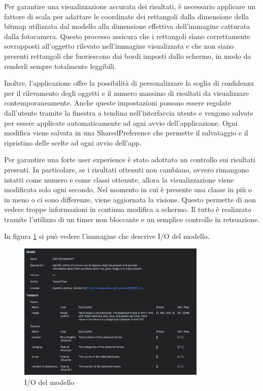 Per garantire una visualizzazione accurata dei risultati, è necessario applicare un fattore di scala per adattare le coordinate dei rettangoli dalla
dimensione della bitmap utilizzata dal modello alla dimensione effettiva dell'immagine catturata dalla fotocamera. Questo processo assicura che i rettangoli
siano correttamente sovrapposti all'oggetto rilevato nell'immagine visualizzata e che non siano presenti rettangoli che fuoriescono dai bordi imposti dallo
schermo, in modo da renderli sempre totalmente leggibili.

Inoltre, l'applicazione offre la possibilità di personalizzare la soglia di confidenza per il rilevamento degli oggetti e il numero massimo di risultati da
visualizzare contemporaneamente. Anche queste impostazioni possono essere regolate dall'utente tramite la finestra a tendina nell'interfaccia utente e
vengono salvate per essere applicate automaticamente ad ogni avvio dell'applicazione.
Ogni modifica viene salvata in una SharedPreference che permette il salvataggio e il ripristino delle scelte ad ogni avvio dell’app.

Per garantire una forte user experience è stato adottato un controllo sui risultati presenti. In particolare, se i risultati ottenuti non cambiano, ovvero
rimangono intatti come numero e come classi ottenute, allora la visualizzazione viene modificata solo ogni secondo. Nel momento in cui è presente una classe
in più o in meno o ci sono differenze, viene aggiornata la visione. Questo permette di non vedere troppe informazioni in continua modifica a schermo. Il
tutto è realizzato tramite l’utilizzo di un timer non bloccante e un semplice controllo in retroazione.

In figura \ref{fig:modello} si può vedere l’immagine che descrive I/O del modello.

\begin{figure}[ht]
    \centering
    \includegraphics[width=0.8\textwidth]{Immagini/App/modello.png}
    \caption{I/O del modello}
    \label{fig:modello}
\end{figure}
